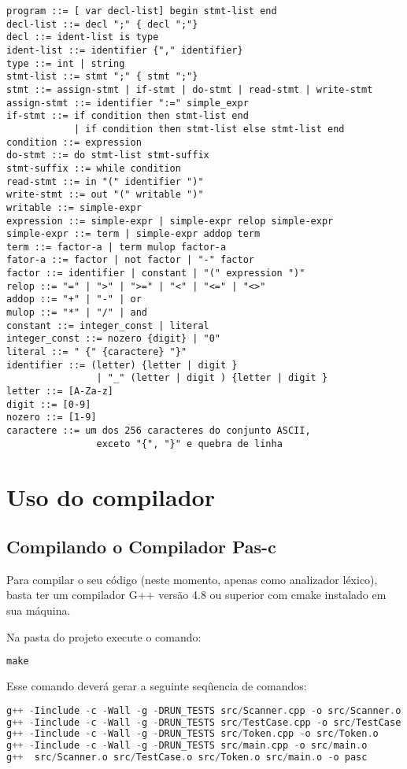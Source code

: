 \documentclass[11pt]{article}
\begin{document}
		\begin{lstlisting}
program ::= [ var decl-list] begin stmt-list end
decl-list ::= decl ";" { decl ";"}
decl ::= ident-list is type
ident-list ::= identifier {"," identifier}
type ::= int | string
stmt-list ::= stmt ";" { stmt ";"}
stmt ::= assign-stmt | if-stmt | do-stmt | read-stmt | write-stmt
assign-stmt ::= identifier ":=" simple_expr
if-stmt ::= if condition then stmt-list end 
			| if condition then stmt-list else stmt-list end
condition ::= expression
do-stmt ::= do stmt-list stmt-suffix
stmt-suffix ::= while condition
read-stmt ::= in "(" identifier ")"
write-stmt ::= out "(" writable ")"
writable ::= simple-expr
expression ::= simple-expr | simple-expr relop simple-expr
simple-expr ::= term | simple-expr addop term
term ::= factor-a | term mulop factor-a
fator-a ::= factor | not factor | "-" factor
factor ::= identifier | constant | "(" expression ")"
relop ::= "=" | ">" | ">=" | "<" | "<=" | "<>"
addop ::= "+" | "-" | or
mulop ::= "*" | "/" | and
constant ::= integer_const | literal
integer_const ::= nozero {digit} | "0"
literal ::= " {" {caractere} "}"
identifier ::= (letter) {letter | digit } 
				| "_" (letter | digit ) {letter | digit }
letter ::= [A-Za-z]
digit ::= [0-9]
nozero ::= [1-9]
caractere ::= um dos 256 caracteres do conjunto ASCII, 
				exceto "{", "}" e quebra de linha
		\end{lstlisting}

\newpage
\section{Uso do compilador}

	
	\subsection{Compilando o Compilador Pas-c}

		Para compilar o seu código (neste momento, apenas como analizador léxico), basta ter um compilador G++ versão 4.8 ou superior com cmake instalado em sua máquina.
		
		Na pasta do projeto execute o comando:
\begin{lstlisting}[language=C++]
make
\end{lstlisting} 
		
		Esse comando deverá gerar a seguinte seqûencia de comandos:
\begin{lstlisting}[language=C++]
g++ -Iinclude -c -Wall -g -DRUN_TESTS src/Scanner.cpp -o src/Scanner.o
g++ -Iinclude -c -Wall -g -DRUN_TESTS src/TestCase.cpp -o src/TestCase.o
g++ -Iinclude -c -Wall -g -DRUN_TESTS src/Token.cpp -o src/Token.o
g++ -Iinclude -c -Wall -g -DRUN_TESTS src/main.cpp -o src/main.o
g++  src/Scanner.o src/TestCase.o src/Token.o src/main.o -o pasc
\end{lstlisting}
		
\end{document}
